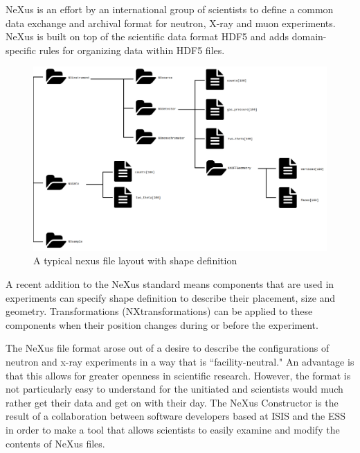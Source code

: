 NeXus is an effort by an international group of scientists to define a common data exchange and archival format for neutron, X-ray and muon experiments. NeXus is built on top of the scientific data format HDF5 and adds domain-specific rules for organizing data within HDF5 files.

\begin{figure}
\caption{A typical nexus file layout with shape definition}
\includegraphics[width=\linewidth]{nexusdiagram.png}
\end{figure}

A recent addition to the NeXus standard means components that are used in experiments can specify shape definition to describe their placement, size and geometry. Transformations (NXtransformations) can be applied to these components when their position changes during or before the experiment. 

The NeXus file format arose out of a desire to describe the configurations of neutron and x-ray experiments in a way that is ``facility-neutral." An advantage is that this allows for greater openness in scientific research. However, the format is not particularly easy to understand for the unitiated and scientists would much rather get their data and get on with their day. The NeXus Constructor is the result of a collaboration between software developers based at ISIS and the ESS in order to make a tool that allows scientists to easily examine and modify the contents of NeXus files.
